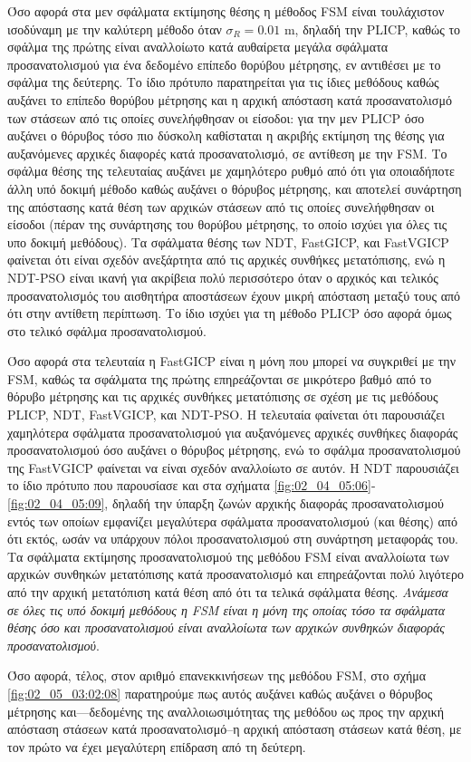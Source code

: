 Όσο αφορά στα μεν σφάλματα εκτίμησης θέσης η μέθοδος FSM είναι τουλάχιστον
ισοδύναμη με την καλύτερη μέθοδο όταν $\sigma_R = 0.01$ m, δηλαδή την PLICP,
καθώς το σφάλμα της πρώτης είναι αναλλοίωτο κατά αυθαίρετα μεγάλα σφάλματα
προσανατολισμού για ένα δεδομένο επίπεδο θορύβου μέτρησης, εν αντιθέσει με το
σφάλμα της δεύτερης. Το ίδιο πρότυπο παρατηρείται για τις ίδιες μεθόδους καθώς
αυξάνει το επίπεδο θορύβου μέτρησης και η αρχική απόσταση κατά προσανατολισμό
των στάσεων από τις οποίες συνελήφθησαν οι είσοδοι: για την μεν PLICP όσο
αυξάνει ο θόρυβος τόσο πιο δύσκολη καθίσταται η ακριβής εκτίμηση της θέσης για
αυξανόμενες αρχικές διαφορές κατά προσανατολισμό, σε αντίθεση με την FSM. Το
σφάλμα θέσης της τελευταίας αυξάνει με χαμηλότερο ρυθμό από ότι για οποιαδήποτε
άλλη υπό δοκιμή μέθοδο καθώς αυξάνει ο θόρυβος μέτρησης, και αποτελεί συνάρτηση
της απόστασης κατά θέση των αρχικών στάσεων από τις οποίες συνελήφθησαν οι
είσοδοι (πέραν της συνάρτησης του θορύβου μέτρησης, το οποίο ισχύει για όλες
τις υπο δοκιμή μεθόδους). Τα σφάλματα θέσης των NDT, FastGICP, και FastVGICP
φαίνεται ότι είναι σχεδόν ανεξάρτητα από τις αρχικές συνθήκες μετατόπισης, ενώ
η NDT-PSO είναι ικανή για ακρίβεια πολύ περισσότερο όταν ο αρχικός και τελικός
προσανατολισμός του αισθητήρα αποστάσεων έχουν μικρή απόσταση μεταξύ τους από
ότι στην αντίθετη περίπτωση. Το ίδιο ισχύει για τη μέθοδο PLICP όσο αφορά όμως
στο τελικό σφάλμα προσανατολισμού.

Όσο αφορά στα τελευταία η FastGICP είναι η μόνη που μπορεί να συγκριθεί με την
FSM, καθώς τα σφάλματα της πρώτης επηρεάζονται σε μικρότερο βαθμό από το θόρυβο
μέτρησης και τις αρχικές συνθήκες μετατόπισης σε σχέση με τις μεθόδους PLICP,
NDT, FastVGICP, και NDT-PSO. Η τελευταία φαίνεται ότι παρουσιάζει χαμηλότερα
σφάλματα προσανατολισμού για αυξανόμενες αρχικές συνθήκες διαφοράς
προσανατολισμού όσο αυξάνει ο θόρυβος μέτρησης, ενώ το σφάλμα προσανατολισμού
της FastVGICP φαίνεται να είναι σχεδόν αναλλοίωτο σε αυτόν. Η NDT παρουσιάζει
το ίδιο πρότυπο που παρουσίασε και στα σχήματα
\ref{fig:02_04_05:06}-\ref{fig:02_04_05:09}, δηλαδή την ύπαρξη ζωνών αρχικής
διαφοράς προσανατολισμού εντός των οποίων εμφανίζει μεγαλύτερα σφάλματα
προσανατολισμού (και θέσης) από ότι εκτός, ωσάν να υπάρχουν πόλοι
προσανατολισμού στη συνάρτηση μεταφοράς του. Τα σφάλματα εκτίμησης
προσανατολισμού της μεθόδου FSM είναι αναλλοίωτα των αρχικών συνθηκών
μετατόπισης κατά προσανατολισμό και επηρεάζονται πολύ λιγότερο από την αρχική
μετατόπιση κατά θέση από ότι τα τελικά σφάλματα θέσης. \textit{Ανάμεσα σε όλες
τις υπό δοκιμή μεθόδους η FSM είναι η μόνη της οποίας τόσο τα σφάλματα θέσης
όσο και προσανατολισμού είναι αναλλοίωτα των αρχικών συνθηκών διαφοράς
προσανατολισμού}.

Όσο αφορά, τέλος, στον αριθμό επανεκκινήσεων της μεθόδου FSM, στο σχήμα
\ref{fig:02_05_03:02:08} παρατηρούμε πως αυτός αυξάνει καθώς αυξάνει ο θόρυβος
μέτρησης και---δεδομένης της αναλλοιωσιμότητας της μεθόδου ως προς την αρχική
απόσταση στάσεων κατά προσανατολισμό--η αρχική απόσταση στάσεων κατά θέση,
με τον πρώτο να έχει μεγαλύτερη επίδραση από τη δεύτερη.

